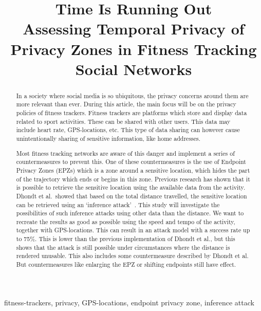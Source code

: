\documentclass[conference]{IEEEtran}
\begin{document}
\title{\textbf{\LARGE Time Is Running Out\\
        \large Assessing Temporal Privacy of Privacy Zones in Fitness Tracking Social Networks}
}

\author{
}
\maketitle
\thispagestyle{plain}
\pagestyle{plain}

\begin{abstract}
    In a society where social media is so ubiquitous, the privacy concerns
    around them are more relevant than ever.  During this article, the main
    focus will be on the privacy policies of fitness trackers. Fitness trackers are
    platforms which store and display data related to sport activities. These can
    be shared with other users. This data may include heart rate, GPS-locations,
    etc. This type of data sharing can however cause unintentionally sharing of
    sensitive information, like home addresses.

    Most fitness tracking networks are aware of this danger and implement a series
    of countermeasures to prevent this. One of these countermeasures is the use of
    Endpoint Privacy Zones (EPZs) which is a zone around a sensitive location,
    which hides the part of the trajectory which ends or begins in this zone.
    Previous research has shown that it is possible to retrieve the sensitive
    location using the available data from the activity. Dhondt et al.\ showed that
    based on the total distance travelled, the sensitive location can be retrieved
    using an `inference attack'~\cite{Dhondt}. This study will investigate the
    possibilities of such inference attacks using other data than the distance. We
    want to recreate the results as good as possible using the speed and tempo of
    the activity, together with GPS-locations. This can result in an attack model
    with a success rate up to 75\%. This is lower than the previous implementation
    of Dhondt et al., but this shows that the attack is still possible under
    circumstances where the distance is rendered unusable. This also includes some
    countermeasure described by Dhondt et al. But countermeasures like enlarging
    the EPZ or shifting endpoints still have effect.\vspace{6pt}

\end{abstract}
\begin{IEEEkeywords}
    fitness-trackers, privacy, GPS-locations, endpoint privacy zone, inference attack
\end{IEEEkeywords}
\end{document}
